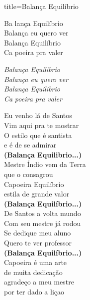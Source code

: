 \documentclass[fontsize=14pt, paper=a4, twoside, DIV=20]{scrreprt} %
\begin{document}
\begin{multicols*}{2}
\begin{song}{title={Balança Equilíbrio}}
    \begin{verse*}
        Ba lança Equilíbrio\\
        Balança eu quero ver\\
        Balança Equilíbrio\\
        Ca poeira pra valer\\

        \begin{chorus*}
        \textit{Balança Equilibrio}\\
        \textit{Balança eu quero ver}\\
        \textit{Balança Equilibrio}\\
        \textit{Ca} \textit{poeira pra valer}\\
        \end{chorus*}
        
        Eu venho lá de Santos\\
        Vim aqui pra te mostrar\\
        O estilo que é santista\\
        e é de se admirar\\
        \textbf{(Balança Equilibrio...)}\\

        Mestre Índio vem da Terra\\
        que o consagrou\\
        Capoeira Equilíbrio\\
        estila de grande valor\\
        \textbf{(Balança Equilíbrio...)}\\

        De Santos a volta mundo\\
        Com seu mestre já rodou\\
        Se dedique meu aluno\\
        Quero te ver professor\\
        \textbf{(Balança Equilíbrio...)}\\

        Capoeira é uma arte\\
        de muita dedicação\\
        agradeço a meu mestre\\
        por ter dado a liçao\\
    \end{verse*}
\end{song}


\end{multicols*}
\end{document}
